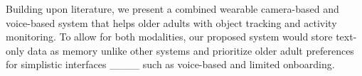 Building upon literature, we present a combined wearable camera-based and voice-based system that helps older adults with object tracking and activity monitoring. To allow for both modalities, our proposed system would store text-only data as memory unlike other systems and prioritize older adult preferences for simplistic interfaces ____ such as voice-based and limited onboarding. %







